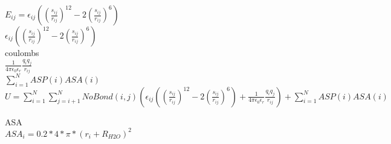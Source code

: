 \documentclass{article}
\begin{document}
\changefontsizes{10pt}
$E_{ij}=\epsilon_{ij}\left(\left(\frac{s_{ij}}{r_{ij}}\right)^{12}-2\left(\frac{s_{ij}}{r_{ij}}\right)^{6}\right)$ \\

$\epsilon_{ij}\left(\left(\frac{s_{ij}}{r_{ij}}\right)^{12}-2\left(\frac{s_{ij}}{r_{ij}}\right)^{6}\right)$ \\

coulombs \\
$\frac{1}{4\pi\epsilon_{0}\epsilon_{r}}\frac{q_{i}q_{j}}{r_{ij}}$ \\

$ \sum_{i=1}^{N} ASP(i)ASA(i)$ \\

$U = \sum_{i=1}^{N} \sum_{j=i+1}^{N} NoBond(i,j)
\left(\epsilon_{ij}\left(\left(\frac{s_{ij}}{r_{ij}}\right)^{12}-2\left(\frac{s_{ij}}{r_{ij}}\right)^{6}\right)+\frac{1}{4\pi\epsilon_{0}\epsilon_{r}}\frac{q_{i}q_{j}}{r_{ij}}\right)+
\sum_{i=1}^{N} ASP(i)ASA(i)$

ASA \\
$ASA_i=0.2*4*\pi*(r_i+R_{H2O})^2$
\end{document}
